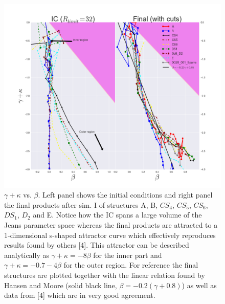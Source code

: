 \begin{figure}[!htbp]
\centering
\includegraphics[width=1.0\linewidth]{img/Fig_beta_gamma_kappa_ABCS4CS5CS6DS1D2E_IC_Final_R_limit_32.png}
\caption{$\gamma + \kappa$ vs. $\beta$. Left panel shows the initial conditions and right panel the final products after sim. I of structures A, B, $CS_4$, $CS_5$, $CS_6$, $DS_1$, $D_2$ and E. Notice how the IC spans a large volume of the Jeans parameter space whereas the final products are attracted to a 1-dimensional s-shaped attractor curve which effectively reproduces results found by others [4]. This attractor can be described analytically as $\gamma + \kappa = -8\beta $ for the inner part and $\gamma + \kappa = -0.7-4\beta $ for the outer region. For reference the final structures are plotted together with the linear relation found by Hansen and Moore (solid black line, $ \beta = -0.2(\gamma + 0.8)$) as well as data from [4] which are in very good agreement.}
\label{fig:test}
\end{figure}

